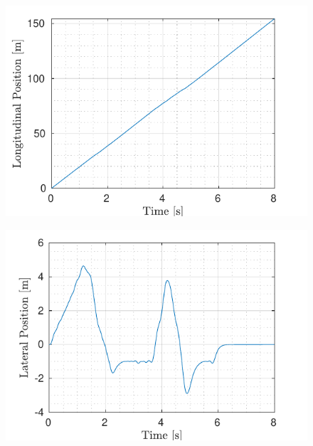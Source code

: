 \begin{figure}[!t] %
	\begin{minipage}[t]{0.5\textwidth}
		\includegraphics[width=\textwidth]{../../MATLAB/6_obstacles/figure/LongitudinalPositionVsTime.pdf}
		\subcaption{}\label{fig:longitudinal_six_moving}
	\end{minipage}
	\begin{minipage}[t]{0.5\textwidth}
		\includegraphics[width=\textwidth]{../../MATLAB/6_obstacles/figure/LateralPositionVsTime.pdf}
		\subcaption{}\label{fig:lateral_six_moving}
	\end{minipage}
	\begin{minipage}[t]{0.5\textwidth}

\end{minipage}
\end{figure}
